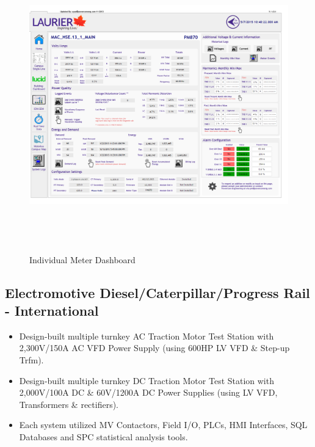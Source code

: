 	\begin{center}
	\begin{figure}
			\includegraphics[height=5in]{../Images/WLU6.png}
		\caption{Individual Meter Dashboard}
		\label{fig:IndividualMeterDashboard}
	\end{figure}
	\end{center}

\pagebreak


\subsection{Electromotive Diesel/Caterpillar/Progress Rail - International}
\label{PreExp:TMTS}

\begin{itemize}
	\item Design-built multiple turnkey AC Traction Motor Test Station with 2,300V/150A AC VFD Power Supply (using 600HP LV VFD \& Step-up Trfm).
	\item Design-built multiple turnkey DC Traction Motor Test Station with 2,000V/100A DC \& 60V/1200A DC Power Supplies (using LV VFD,  Transformers \& rectifiers).
	\item Each system utilized MV Contactors, Field I/O, PLCs, HMI Interfaces, SQL  Databases and SPC statistical analysis tools. 
\end{itemize}

